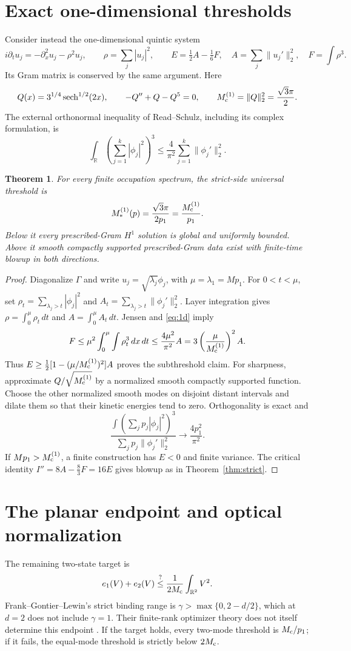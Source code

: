 \documentclass[11pt,a4paper]{article}
\newtheorem{theorem}{Theorem}
\newcommand{\R}{\mathbb R}
\newcommand{\mc}{M_{\rm c}}
\begin{document}
\section{Exact one-dimensional thresholds}
Consider instead the one-dimensional quintic system
\[
 i\partial_tu_j=-\partial_x^2u_j-\rho^2u_j,\qquad
 \rho=\sum_j|u_j|^2,\qquad E=\tfrac12A-\tfrac16F,
 \quad A=\sum_j\|u_j'\|_2^2,\quad F=\int\rho^3.
\]
Its Gram matrix is conserved by the same argument. Here
\[
 Q(x)=3^{1/4}\operatorname{sech}^{1/2}(2x),\qquad
 -Q''+Q-Q^5=0,\qquad M_{\rm c}^{(1)}=\|Q\|_2^2=\frac{\sqrt3\pi}{2}.
\]
The external orthonormal inequality of Read--Schulz, including its complex formulation, is
\begin{equation}\label{eq:1d}
 \int_\R\left(\sum_{j=1}^k|\phi_j|^2\right)^3
 \le\frac4{\pi^2}\sum_{j=1}^k\|\phi_j'\|_2^2.
\end{equation}
\begin{theorem}
For every finite occupation spectrum, the strict-side universal threshold is
\[
 M_*^{(1)}(p)=\frac{\sqrt3\pi}{2p_1}=\frac{M_{\rm c}^{(1)}}{p_1}.
\]
Below it every prescribed-Gram $H^1$ solution is global and uniformly bounded. Above it smooth compactly supported prescribed-Gram data exist with finite-time blowup in both directions.
\end{theorem}
\begin{proof}
Diagonalize $\Gamma$ and write $u_j=\sqrt{\lambda_j}\phi_j$, with $\mu=\lambda_1=Mp_1$. For $0<t<\mu$, set $\rho_t=\sum_{\lambda_j>t}|\phi_j|^2$ and $A_t=\sum_{\lambda_j>t}\|\phi_j'\|_2^2$. Layer integration gives $\rho=\int_0^\mu\rho_t\,dt$ and $A=\int_0^\mu A_t\,dt$. Jensen and \eqref{eq:1d} imply
\[
 F\le\mu^2\int_0^\mu\int\rho_t^3\,dx\,dt
 \le\frac{4\mu^2}{\pi^2}A
 =3\left(\frac\mu{M_{\rm c}^{(1)}}\right)^2A.
\]
Thus $E\ge\frac12[1-(\mu/M_{\rm c}^{(1)})^2]A$ proves the subthreshold claim.
For sharpness, approximate $Q/\sqrt{M_{\rm c}^{(1)}}$ by a normalized smooth compactly supported function. Choose the other normalized smooth modes on disjoint distant intervals and dilate them so that their kinetic energies tend to zero. Orthogonality is exact and
\[
 \frac{\int(\sum_jp_j|\phi_j|^2)^3}{\sum_jp_j\|\phi_j'\|_2^2}
 \longrightarrow\frac{4p_1^2}{\pi^2}.
\]
If $Mp_1>M_{\rm c}^{(1)}$, a finite construction has $E<0$ and finite variance. The critical identity $I''=8A-\frac83F=16E$ gives blowup as in Theorem~\ref{thm:strict}.
\end{proof}

\section{The planar endpoint and optical normalization}
The remaining two-state target is
\[
 e_1(V)+e_2(V)\stackrel{?}{\le}\frac1{2\mc}\int_{\R^2}V^2.
\]
Frank--Gontier--Lewin's strict binding range is $\gamma>\max\{0,2-d/2\}$, which at $d=2$ does not include $\gamma=1$. Their finite-rank optimizer theory does not itself determine this endpoint \cite{FGL,FGLrank}. If the target holds, every two-mode threshold is $\mc/p_1$; if it fails, the equal-mode threshold is strictly below $2\mc$.
\end{document}
